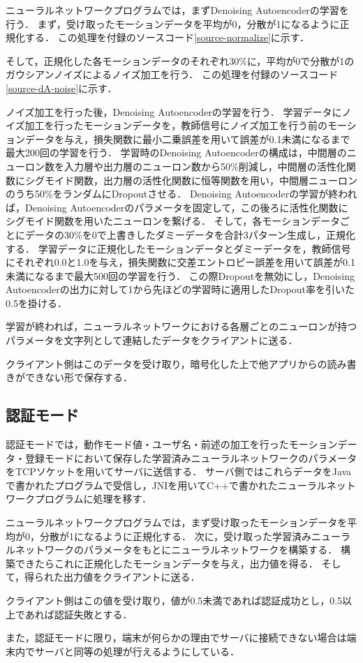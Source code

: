 ニューラルネットワークプログラムでは，まずDenoising Autoencoderの学習を行う．
まず，受け取ったモーションデータを平均が0，分散が1になるように正規化する．
この処理を付録のソースコード\ref{source-normalize}に示す．

そして，正規化した各モーションデータのそれぞれ30\%に，平均が0で分散が1のガウシアンノイズによるノイズ加工を行う．
この処理を付録のソースコード\ref{source-dA-noise}に示す．

ノイズ加工を行った後，Denoising Autoencoderの学習を行う．
学習データにノイズ加工を行ったモーションデータを，教師信号にノイズ加工を行う前のモーションデータを与え，損失関数に最小二乗誤差を用いて誤差が0.1未満になるまで最大200回の学習を行う．
学習時のDenoising Autoencoderの構成は，中間層のニューロン数を入力層や出力層のニューロン数から50\%削減し，中間層の活性化関数にシグモイド関数，出力層の活性化関数に恒等関数を用い，中間層ニューロンのうち50\%をランダムにDropoutさせる．
Denoising Autoencoderの学習が終われば，Denoising Autoencoderのパラメータを固定して，この後ろに活性化関数にシグモイド関数を用いたニューロンを繋げる．
そして，各モーションデータごとにデータの30\%を0で上書きしたダミーデータを合計3パターン生成し，正規化する．
学習データに正規化したモーションデータとダミーデータを，教師信号にそれぞれ0.0と1.0を与え，損失関数に交差エントロピー誤差を用いて誤差が0.1未満になるまで最大500回の学習を行う．
この際Dropoutを無効にし，Denoising Autoencoderの出力に対して1から先ほどの学習時に適用したDropout率を引いた0.5を掛ける．

学習が終われば，ニューラルネットワークにおける各層ごとのニューロンが持つパラメータを文字列として連結したデータをクライアントに送る．

クライアント側はこのデータを受け取り，暗号化した上で他アプリからの読み書きができない形で保存する．

\subsection{認証モード}
認証モードでは，動作モード値・ユーザ名・前述の加工を行ったモーションデータ・登録モードにおいて保存した学習済みニューラルネットワークのパラメータをTCPソケットを用いてサーバに送信する．
サーバ側ではこれらデータをJavaで書かれたプログラムで受信し，JNIを用いてC++で書かれたニューラルネットワークプログラムに処理を移す．

ニューラルネットワークプログラムでは，まず受け取ったモーションデータを平均が0，分散が1になるように正規化する．
次に，受け取った学習済みニューラルネットワークのパラメータをもとにニューラルネットワークを構築する．
構築できたらこれに正規化したモーションデータを与え，出力値を得る．
そして，得られた出力値をクライアントに送る．

クライアント側はこの値を受け取り，値が0.5未満であれば認証成功とし，0.5以上であれば認証失敗とする．

また，認証モードに限り，端末が何らかの理由でサーバに接続できない場合は端末内でサーバと同等の処理が行えるようにしている．
